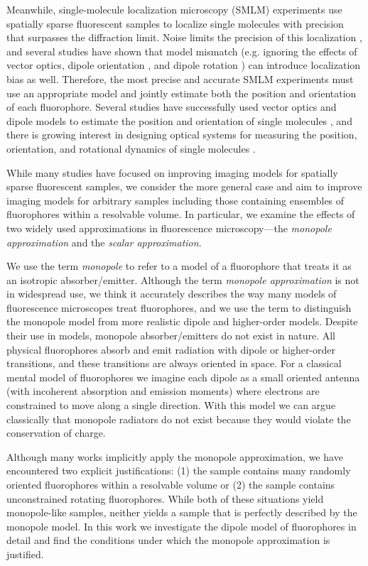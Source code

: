 \documentclass[]{osa-article}
\begin{document}
Meanwhile, single-molecule localization microscopy (SMLM) experiments use
spatially sparse fluorescent samples to localize single molecules with precision
that surpasses the diffraction limit. Noise limits the precision of this
localization \cite{foreman2011, chao2016}, and several studies have shown that
model mismatch (e.g. ignoring the effects of vector optics, dipole orientation
\cite{backlund2014}, and dipole rotation \cite{lew2013}) can introduce
localization bias as well. Therefore, the most precise and accurate SMLM
experiments must use an appropriate model and jointly estimate both the position
and orientation of each fluorophore. Several studies have successfully used
vector optics and dipole models to estimate the position and orientation of
single molecules \cite{bohmer2003, lieb2004, toprak2006, aguet2009}, and there
is growing interest in designing optical systems for measuring the position,
orientation, and rotational dynamics of single molecules \cite{agrawal2012,
  backer2014, stallinga2015, zhang2018, zhang2018-2}.

While many studies have focused on improving imaging models for spatially sparse
fluorescent samples, we consider the more general case and aim to improve
imaging models for arbitrary samples including those containing ensembles of
fluorophores within a resolvable volume. In particular, we examine the effects
of two widely used approximations in fluorescence microscopy---the
\textit{monopole approximation} and the \textit{scalar approximation}.

We use the term \textit{monopole} to refer to a model of a fluorophore that
treats it as an isotropic absorber/emitter. Although the term \textit{monopole
  approximation} is not in widespread use, we think it accurately describes the
way many models of fluorescence microscopes treat fluorophores, and we use the
term to distinguish the monopole model from more realistic dipole and
higher-order models. Despite their use in models, monopole absorber/emitters do
not exist in nature. All physical fluorophores absorb and emit radiation with
dipole or higher-order transitions, and these transitions are always oriented in
space. For a classical mental model of fluorophores we imagine each dipole as a
small oriented antenna (with incoherent absorption and emission moments) where
electrons are constrained to move along a single direction. With this model we
can argue classically that monopole radiators do not exist because they would
violate the conservation of charge.

Although many works implicitly apply the monopole approximation, we have
encountered two explicit justifications: (1) the sample contains many randomly
oriented fluorophores within a resolvable volume or (2) the sample contains
unconstrained rotating fluorophores. While both of these situations yield
monopole-like samples, neither yields a sample that is perfectly described by
the monopole model. In this work we investigate the dipole model of fluorophores
in detail and find the conditions under which the monopole approximation is
justified.
\end{document}
